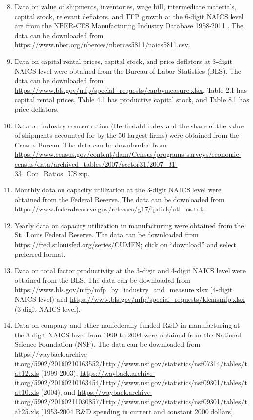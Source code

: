 \documentclass[a4paper,11pt]{article}
\begin{document}
\begin{enumerate}[(1)] \setcounter{enumi}{7}
\item \label{s:ces} Data on value of shipments, inventories, wage bill, intermediate materials, capital stock, relevant deflators, and TFP growth at the 6-digit NAICS level are from the NBER-CES Manufacturing Industry Database 1958-2011 \citep{BeGM16}. The data can be downloaded from \url{https://www.nber.org/nberces/nberces5811/naics5811.csv}. %

\item \label{s:cap} Data on capital rental prices, capital stock, and price deflators at 3-digit NAICS level were obtained from the Bureau of Labor Statistics (BLS). The data can be downloaded from \url{https://www.bls.gov/mfp/special\_requests/capbymeasure.xlsx}. Table 2.1 has capital rental prices, Table 4.1 has productive capital stock, and Table 8.1 has price deflators.

\item \label{s:conc} Data on industry concentration (Herfindahl index and the share of the value of shipments accounted for by the 50 largest firms) were obtained from the Census Bureau. The data can be downloaded from \url{https://www.census.gov/content/dam/Census/programs-surveys/economic-census/data/archived_tables/2007/sector31/2007_31-33_Con_Ratios_US.zip}.

\item \label{s:cumonth} Monthly data on capacity utilization at the 3-digit NAICS level were obtained from the Federal Reserve. The data can be downloaded from \url{https://www.federalreserve.gov/releases/g17/ipdisk/utl_sa.txt}.

\item \label{s:cu} Yearly data on capacity utilization in manufacturing were obtained from the St.~Louis Federal Reserve. The data can be downloaded from \url{https://fred.stlouisfed.org/series/CUMFN}; click on ``download'' and select preferred format.

\item \label{s:tfp} Data on total factor productivity at the 3-digit and 4-digit NAICS level were obtained from the BLS. The data can be downloaded from \url{https://www.bls.gov/mfp/mfp_by_industry_and_measure.xlsx} (4-digit NAICS level) and \url{https://www.bls.gov/mfp/special_requests/klemsmfp.xlsx} (3-digit NAICS level).

\item \label{s:rd} Data on company and other nonfederally funded R\&D in manufacturing at the 3-digit NAICS level from 1999 to 2004 were obtained from the National Science Foundation (NSF). The data can be downloaded from \url{https://wayback.archive-it.org/5902/20160210163552/http://www.nsf.gov/statistics/nsf07314/tables/tab12.xls} (1999-2003), \url{https://wayback.archive-it.org/5902/20160210163454/http://www.nsf.gov/statistics/nsf09301/tables/tab10.xls} (2004), and \url{https://wayback.archive-it.org/5902/20160211030857/http://www.nsf.gov/statistics/nsf09301/tables/tab25.xls} (1953-2004 R\&D spending in current and constant 2000 dollars).


\end{enumerate}
\end{document}
